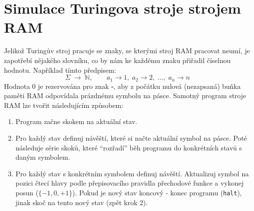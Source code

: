 \section{Simulace Turingova stroje strojem RAM}
Jelikož Turingův stroj pracuje se znaky, se kterými stroj RAM pracovat neumí, je zapotřebí nějakého slovníku, 
co by nám ke každému znaku přiřadil číselnou hodnotu. Například tímto předpisem:
\[
  \Sigma \;\longrightarrow\; \mathbb{N},\qquad 
  a_1 \rightarrow 1,\; a_2 \rightarrow 2,\;\dots,\; a_n \rightarrow n
\]
Hodnota 0 je rezervována pro znak $\square$, aby z počátku nulová (nezapsaná) buňka paměti RAM odpovídala prázdnému symbolu na pásce.
Samotný program stroje RAM lze tvořit následujícím způsobem:
\begin{enumerate}
	\item Program začne skokem na aktuální stav.
	\item Pro každý stav definuj návěští, které si načte aktuální symbol na pásce. 
		Poté následuje série skoků, které \enquote{rozřadí} běh programu do konkrétních stavů s daným symbolem.
	\item Pro každý stav s konkrétním symbolem definuj návěští. Aktualizuj symbol na pozici čtecí hlavy podle přepisovacího pravidla přechodové funkce a vykonej posun ($\{-1, 0, +1\}$). 
		Pokud je nový stav koncový - konec programu (\texttt{halt}), jinak skoč na tento nový stav (zpět krok 2).
\end{enumerate}